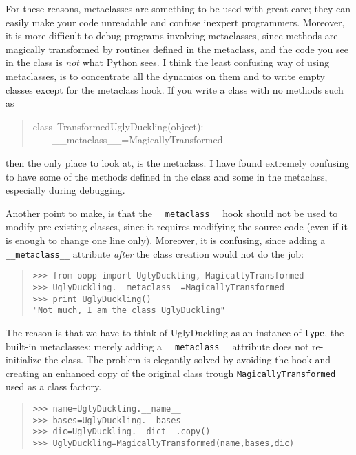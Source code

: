 \documentclass[10pt,english]{article}
\begin{document}
For these reasons, metaclasses are something to be used with great care; 
they can easily make your code unreadable and confuse inexpert programmers. 
Moreover, it is more difficult to debug programs involving metaclasses, since
methods are magically transformed by routines defined in the metaclass,
and the code you see in the class is \emph{not} what Python sees. I think
the least confusing way of using metaclasses, is to concentrate all
the dynamics on them and to write empty classes except for the
metaclass hook. If you write a class with no methods such as
\begin{quote}
\begin{ttfamily}\begin{flushleft}
\mbox{class~TransformedUglyDuckling(object):}\\
\mbox{~~~~{\_}{\_}metaclass{\_}{\_}=MagicallyTransformed}
\end{flushleft}\end{ttfamily}
\end{quote}

then the only place to look at, is the metaclass. I have found extremely
confusing to have some of the methods defined in the class and some in
the metaclass, especially during debugging.

Another point to make, is that the \texttt{{\_}{\_}metaclass{\_}{\_}}
hook should not be used to modify pre-existing classes, 
since it requires modifying the source code (even if it is enough to 
change one line only). Moreover, it is confusing, since adding a 
\texttt{{\_}{\_}metaclass{\_}{\_}} attribute \emph{after} the class creation would not do the job:
\begin{quote}
\begin{verbatim}>>> from oopp import UglyDuckling, MagicallyTransformed
>>> UglyDuckling.__metaclass__=MagicallyTransformed
>>> print UglyDuckling()
"Not much, I am the class UglyDuckling"\end{verbatim}
\end{quote}

The reason is that we have to think of UglyDuckling as an instance of 
\texttt{type}, the built-in metaclasses; merely adding a \texttt{{\_}{\_}metaclass{\_}{\_}} 
attribute does not re-initialize the class.
The problem is elegantly solved by avoiding the hook and creating
an enhanced copy of the original class trough \texttt{MagicallyTransformed}
used as a class factory.
\begin{quote}
\begin{verbatim}>>> name=UglyDuckling.__name__
>>> bases=UglyDuckling.__bases__
>>> dic=UglyDuckling.__dict__.copy()
>>> UglyDuckling=MagicallyTransformed(name,bases,dic)\end{verbatim}
\end{quote}
\end{document}
